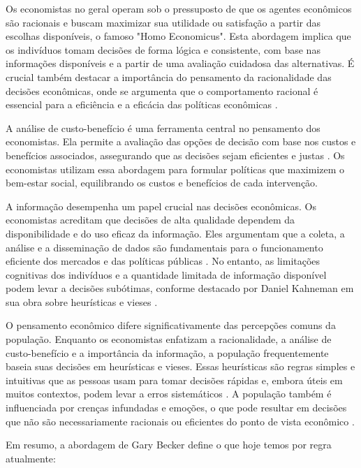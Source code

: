 Os economistas no geral operam sob o pressuposto de que os agentes econômicos são racionais e buscam maximizar sua utilidade ou satisfação a partir das escolhas disponíveis, o famoso "Homo Economicus". Esta abordagem implica que os indivíduos tomam decisões de forma lógica e consistente, com base nas informações disponíveis e a partir de uma avaliação cuidadosa das alternativas. É crucial também destacar a importância do pensamento da racionalidade das decisões econômicas, onde se argumenta que o comportamento racional é essencial para a eficiência e a eficácia das políticas econômicas \cite{Hausman_McPherson_Satz_2016}.

A análise de custo-benefício é uma ferramenta central no pensamento dos economistas. Ela permite a avaliação das opções de decisão com base nos custos e benefícios associados, assegurando que as decisões sejam eficientes e justas \cite{KenBinmore2008}. Os economistas utilizam essa abordagem para formular políticas que maximizem o bem-estar social, equilibrando os custos e benefícios de cada intervenção.


A informação desempenha um papel crucial nas decisões econômicas. Os economistas acreditam que decisões de alta qualidade dependem da disponibilidade e do uso eficaz da informação. Eles argumentam que a coleta, a análise e a disseminação de dados são fundamentais para o funcionamento eficiente dos mercados e das políticas públicas \cite{positive_economics_friedman}. No entanto, as limitações cognitivas dos indivíduos e a quantidade limitada de informação disponível podem levar a decisões subótimas, conforme destacado por Daniel Kahneman em sua obra sobre heurísticas e vieses \cite{Judgment_under_Uncertainty}.

O pensamento econômico difere significativamente das percepções comuns da população. Enquanto os economistas enfatizam a racionalidade, a análise de custo-benefício e a importância da informação, a população frequentemente baseia suas decisões em heurísticas e vieses. Essas heurísticas são regras simples e intuitivas que as pessoas usam para tomar decisões rápidas e, embora úteis em muitos contextos, podem levar a erros sistemáticos \cite{Judgment_under_Uncertainty}. A população também é influenciada por crenças infundadas e emoções, o que pode resultar em decisões que não são necessariamente racionais ou eficientes do ponto de vista econômico \cite{thaler2016misbehaving}.

Em resumo, a abordagem de Gary Becker define o que hoje temos por regra atualmente:

